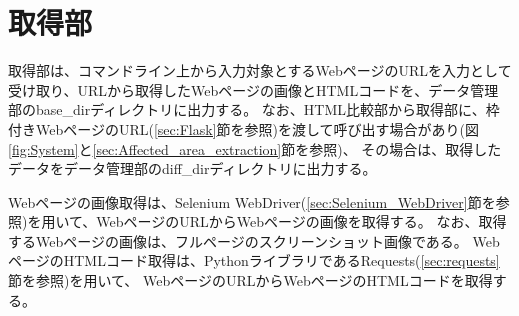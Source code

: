 

\section{取得部}\label{sec:Web_data_get_section}
取得部は、コマンドライン上から入力対象とするWebページのURLを入力として受け取り、URLから取得したWebページの画像とHTMLコードを、データ管理部のbase\_dirディレクトリに出力する。
なお、HTML比較部から取得部に、枠付きWebページのURL(\ref{sec:Flask}節を参照)を渡して呼び出す場合があり(図\ref{fig:System}と\ref{sec:Affected_area_extraction}節を参照)、
その場合は、取得したデータをデータ管理部のdiff\_dirディレクトリに出力する。
\par
Webページの画像取得は、Selenium WebDriver(\ref{sec:Selenium_WebDriver}節を参照)を用いて、WebページのURLからWebページの画像を取得する。
なお、取得するWebページの画像は、フルページのスクリーンショット画像である。
WebページのHTMLコード取得は、PythonライブラリであるRequests(\ref{sec:requests}節を参照)を用いて、
WebページのURLからWebページのHTMLコードを取得する。

